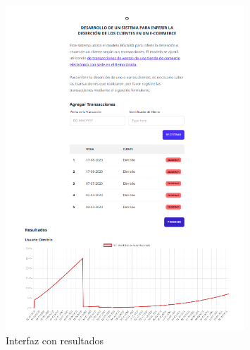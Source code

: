 \begin{figure}[H]
	\centering \includegraphics[width=0.80\textwidth]{images/7.png}
	\caption{Interfaz con resultados}
	\label{fig:ui2}
\end{figure}
